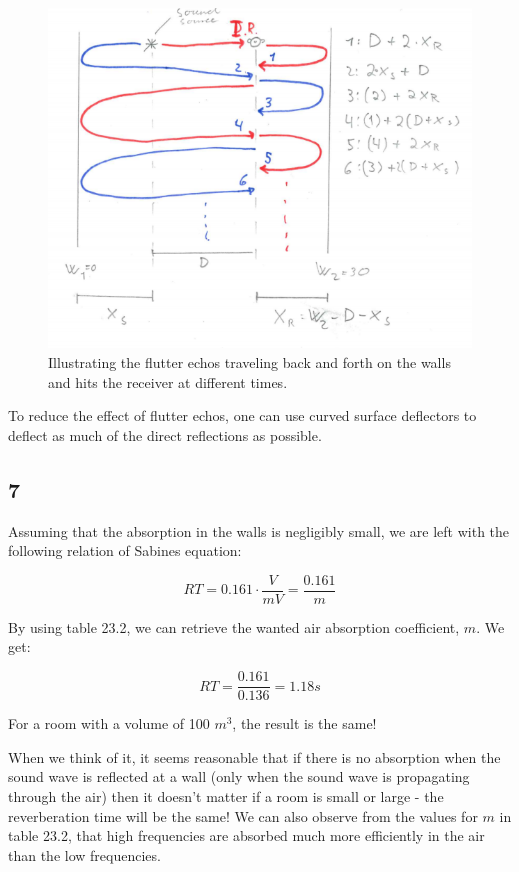 \documentclass{article}
\begin{document}
\begin{figure}[H]
    \centering
    \includegraphics[scale=1.5]{figures/oving1_6.png}
    \caption{Illustrating the flutter echos traveling back and forth on the walls and hits the receiver at different times.}
    \label{fig:flutter}
\end{figure}

To reduce the effect of flutter echos, one can use curved surface deflectors to deflect as much of the direct reflections as possible.



\subsection*{7}

Assuming that the absorption in the walls is negligibly small, we are left with the following relation of Sabines equation:

\begin{equation}
    RT= 0.161 \cdot \frac{V}{mV} = \frac{0.161}{m}
\end{equation}

By using table 23.2, we can retrieve the wanted air absorption coefficient, $m$. We get:

\begin{equation}
    RT= \frac{0.161}{0.136}= 1.18 s
\end{equation}

For a room with a volume of 100 $m^3$, the result is the same!

When we think of it, it seems reasonable that if there is no absorption when the sound wave is reflected at a wall (only when the sound wave is propagating through the air) then it doesn't matter if a room is small or large - the reverberation time will be the same! We can also observe from the values for $m$ in table 23.2, that high frequencies are absorbed much more efficiently in the air than the low frequencies.
\end{document}
